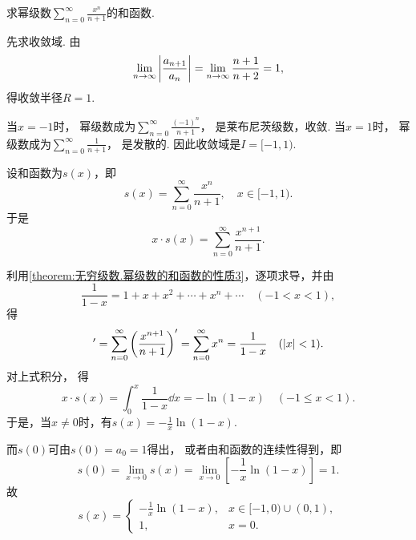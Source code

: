 \begin{example}
求幂级数\(\sum_{n=0}^\infty \frac{x^n}{n+1}\)的和函数.
\begin{solution}
先求收敛域.
由\begin{equation*}
	\lim_{n\to\infty} \abs{\frac{a_{n+1}}{a_n}}
	= \lim_{n\to\infty} \frac{n+1}{n+2}
	= 1,
\end{equation*}
得收敛半径\(R=1\).

当\(x = -1\)时，
幂级数成为\(\sum_{n=0}^\infty \frac{(-1)^n}{n+1}\)，
是莱布尼茨级数，收敛.
当\(x = 1\)时，
幂级数成为\(\sum_{n=0}^\infty \frac{1}{n+1}\)，
是发散的.
因此收敛域是\(I = [-1,1)\).

设和函数为\(s(x)\)，即\begin{equation*}
	s(x) = \sum_{n=0}^\infty \frac{x^n}{n+1},
	\quad x\in[-1,1).
\end{equation*}
于是\begin{equation*}
	x \cdot s(x) = \sum_{n=0}^\infty \frac{x^{n+1}}{n+1}.
\end{equation*}

利用\cref{theorem:无穷级数.幂级数的和函数的性质3}，逐项求导，并由\begin{equation*}
	\frac{1}{1-x} = 1+x+x^2+\dotsb+x^n+\dotsb
	\quad(-1<x<1),
\end{equation*}
得\begin{equation*}
	[x \cdot s(x)]'
	= \sum_{n=0}^\infty \left( \frac{x^{n+1}}{n+1} \right)'
	= \sum_{n=0}^\infty x^n
	= \frac{1}{1-x}
	\quad(\abs{x}<1).
\end{equation*}
对上式积分，
得\begin{equation*}
	x \cdot s(x) = \int_0^x \frac{1}{1-x} \dd{x} = -\ln(1-x)
	\quad(-1 \leq x < 1).
\end{equation*}
于是，当\(x\neq0\)时，有\(s(x) = -\frac{1}{x} \ln(1-x)\).

而\(s(0)\)可由\(s(0) = a_0 = 1\)得出，
或者由和函数的连续性得到，即\begin{equation*}
	s(0)
	= \lim_{x\to0} s(x)
	= \lim_{x\to0} \left[ -\frac{1}{x} \ln(1-x) \right]
	= 1.
\end{equation*}
故\begin{equation*}
	s(x) = \left\{ \begin{array}{cl}
		-\frac{1}{x} \ln(1-x), & x\in[-1,0)\cup(0,1), \\
		1, & x=0.
	\end{array} \right.
\end{equation*}
\end{solution}
\end{example}

